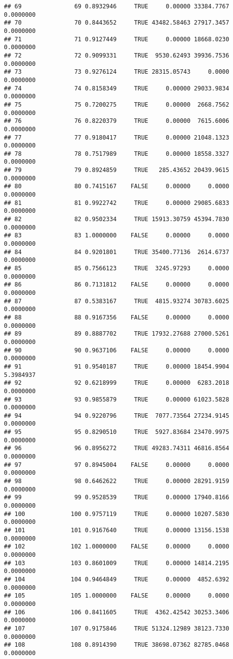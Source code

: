 \documentclass[
]{article}
\begin{document}
\begin{verbatim}
## 69               69 0.8932946     TRUE     0.00000 33384.7767  0.0000000
## 70               70 0.8443652     TRUE 43482.58463 27917.3457  0.0000000
## 71               71 0.9127449     TRUE     0.00000 18668.0230  0.0000000
## 72               72 0.9099331     TRUE  9530.62493 39936.7536  0.0000000
## 73               73 0.9276124     TRUE 28315.05743     0.0000  0.0000000
## 74               74 0.8158349     TRUE     0.00000 29033.9834  0.0000000
## 75               75 0.7200275     TRUE     0.00000  2668.7562  0.0000000
## 76               76 0.8220379     TRUE     0.00000  7615.6006  0.0000000
## 77               77 0.9180417     TRUE     0.00000 21048.1323  0.0000000
## 78               78 0.7517989     TRUE     0.00000 18558.3327  0.0000000
## 79               79 0.8924859     TRUE   285.43652 20439.9615  0.0000000
## 80               80 0.7415167    FALSE     0.00000     0.0000  0.0000000
## 81               81 0.9922742     TRUE     0.00000 29085.6833  0.0000000
## 82               82 0.9502334     TRUE 15913.30759 45394.7830  0.0000000
## 83               83 1.0000000    FALSE     0.00000     0.0000  0.0000000
## 84               84 0.9201801     TRUE 35400.77136  2614.6737  0.0000000
## 85               85 0.7566123     TRUE  3245.97293     0.0000  0.0000000
## 86               86 0.7131812    FALSE     0.00000     0.0000  0.0000000
## 87               87 0.5383167     TRUE  4815.93274 30783.6025  0.0000000
## 88               88 0.9167356    FALSE     0.00000     0.0000  0.0000000
## 89               89 0.8887702     TRUE 17932.27688 27000.5261  0.0000000
## 90               90 0.9637106    FALSE     0.00000     0.0000  0.0000000
## 91               91 0.9540187     TRUE     0.00000 18454.9904  5.3984937
## 92               92 0.6218999     TRUE     0.00000  6283.2018  0.0000000
## 93               93 0.9855879     TRUE     0.00000 61023.5828  0.0000000
## 94               94 0.9220796     TRUE  7077.73564 27234.9145  0.0000000
## 95               95 0.8290510     TRUE  5927.83684 23470.9975  0.0000000
## 96               96 0.8956272     TRUE 49283.74311 46816.8564  0.0000000
## 97               97 0.8945004    FALSE     0.00000     0.0000  0.0000000
## 98               98 0.6462622     TRUE     0.00000 28291.9159  0.0000000
## 99               99 0.9528539     TRUE     0.00000 17940.8166  0.0000000
## 100             100 0.9757119     TRUE     0.00000 10207.5830  0.0000000
## 101             101 0.9167640     TRUE     0.00000 13156.1538  0.0000000
## 102             102 1.0000000    FALSE     0.00000     0.0000  0.0000000
## 103             103 0.8601009     TRUE     0.00000 14814.2195  0.0000000
## 104             104 0.9464849     TRUE     0.00000  4852.6392  0.0000000
## 105             105 1.0000000    FALSE     0.00000     0.0000  0.0000000
## 106             106 0.8411605     TRUE  4362.42542 30253.3406  0.0000000
## 107             107 0.9175846     TRUE 51324.12989 38123.7330  0.0000000
## 108             108 0.8914390     TRUE 38698.07362 82785.0468  0.0000000
\end{verbatim}
\end{document}
